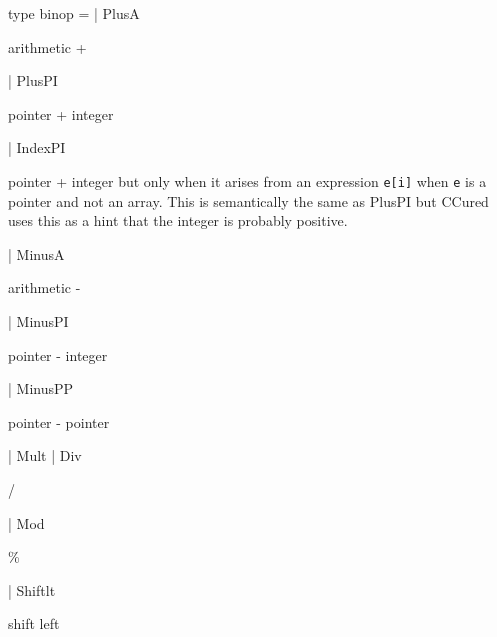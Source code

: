 \documentclass[11pt]{article}
\begin{document}
\label{type:Cil.binop}\begin{ocamldoccode}
type binop =
  | PlusA
\end{ocamldoccode}
\begin{ocamldoccomment}
arithmetic +
\end{ocamldoccomment}
\begin{ocamldoccode}
  | PlusPI
\end{ocamldoccode}
\begin{ocamldoccomment}
pointer + integer
\end{ocamldoccomment}
\begin{ocamldoccode}
  | IndexPI
\end{ocamldoccode}
\begin{ocamldoccomment}
pointer + integer but only when 
 it arises from an expression 
 {\tt{e[i]}} when {\tt{e}} is a pointer and 
 not an array. This is semantically 
 the same as PlusPI but CCured uses 
 this as a hint that the integer is 
 probably positive.
\end{ocamldoccomment}
\begin{ocamldoccode}
  | MinusA
\end{ocamldoccode}
\begin{ocamldoccomment}
arithmetic -
\end{ocamldoccomment}
\begin{ocamldoccode}
  | MinusPI
\end{ocamldoccode}
\begin{ocamldoccomment}
pointer - integer
\end{ocamldoccomment}
\begin{ocamldoccode}
  | MinusPP
\end{ocamldoccode}
\begin{ocamldoccomment}
pointer - pointer
\end{ocamldoccomment}
\begin{ocamldoccode}
  | Mult
  | Div
\end{ocamldoccode}
\begin{ocamldoccomment}
/
\end{ocamldoccomment}
\begin{ocamldoccode}
  | Mod
\end{ocamldoccode}
\begin{ocamldoccomment}
\%
\end{ocamldoccomment}
\begin{ocamldoccode}
  | Shiftlt
\end{ocamldoccode}
\begin{ocamldoccomment}
shift left
\end{ocamldoccomment}
\end{document}
